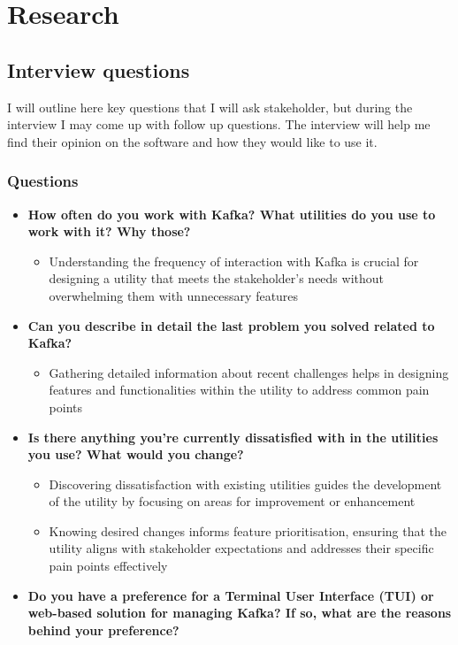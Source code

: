\documentclass[10pt , a4paper]{report}
\begin{document}
\chapter{Research}
\section{Interview questions}

I will outline here key questions that I will ask stakeholder, but during the interview I may come up with follow up questions. The interview will help me find their opinion on the software and how they would like to use it.

\subsection{Questions}
\begin{itemize}
    \item \textbf{How often do you work with Kafka? What utilities do you use to work with it? Why those?}
        \begin{itemize}
            \item Understanding the frequency of interaction with Kafka is crucial for designing a utility that meets the stakeholder's needs without overwhelming them with unnecessary features
        \end{itemize}
    \item \textbf{Can you describe in detail the last problem you solved related to Kafka?}
    \begin{itemize}
            \item Gathering detailed information about recent challenges helps in designing features and functionalities within the utility to address common pain points
    \end{itemize}
    \item \textbf{Is there anything you're currently dissatisfied with in the utilities you use? What would you change?}
        \begin{itemize}
            \item Discovering dissatisfaction with existing utilities guides the development of the utility by focusing on areas for improvement or enhancement
            \item Knowing desired changes informs feature prioritisation, ensuring that the utility aligns with stakeholder expectations and addresses their specific pain points effectively
        \end{itemize}
    \item \textbf{Do you have a preference for a Terminal User Interface (TUI) or web-based solution for managing Kafka? If so, what are the reasons behind your preference?}

\end{itemize}
\end{document}
